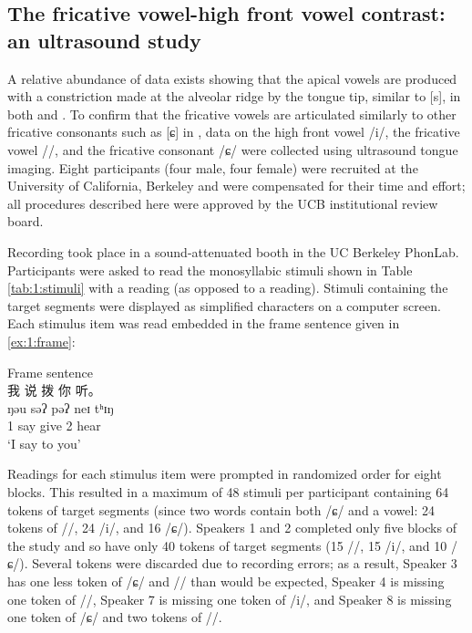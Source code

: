\documentclass[output=paper,hidelinks]{langscibook}
\begin{document}
\subsection{The fricative vowel-high front vowel contrast: an ultrasound study} \label{ultrasound}\label{sec:faytak:2.2}

A relative abundance of data exists showing that the apical vowels are produced with a constriction made at the alveolar ridge by the tongue tip, similar to [s], in both \MC{} and \SC{} \citep{zhou-wu, ling-phd, leekim-s, faytak-icphs}.
%
To confirm that the fricative vowels are articulated similarly to other fricative consonants such as [ɕ] in \SC{}, data on the \SC{} high front vowel /i/, the fricative vowel /\iz/, and the fricative consonant /ɕ/ were collected using ultrasound tongue imaging. Eight participants (four male, four female) were recruited at the University of California, Berkeley and were compensated for their time and effort; all procedures described here were approved by the UCB institutional review board.

Recording took place in a sound-attenuated booth in the UC Berkeley PhonLab. Participants were asked to read the monosyllabic stimuli shown in Table \ref{tab:1:stimuli} with a \SC{} reading (as opposed to a \MC{} reading). Stimuli containing the target segments were displayed as simplified  characters on a computer screen. Each stimulus item was read embedded in the frame sentence given in \ref{ex:1:frame}:

\ea\label{ex:1:frame}
\let\eachwordone\cjkfont
Frame sentence \SC{}\\
\glll 我 说 \underline{\hspace{0.5cm}} 拨 你 听。 \\
	ŋəu səʔ \underline{\hspace{0.5cm}} pəʔ neɪ  tʰɪŋ\\
	1{\sg} say \underline{\hspace{0.5cm}} give 2{\sg} hear\\
\glt `I say \underline{\hspace{0.5cm}} to you'
\z
{}

\noindent Readings for each stimulus item were prompted in randomized order for eight blocks. This resulted in a maximum of 48 stimuli per participant containing 64 tokens of target segments (since two words contain both /ɕ/ and a vowel: 24 tokens of /\iz{}/, 24 /i/, and 16 /ɕ/). Speakers 1 and 2 completed only five blocks of the study and so have only 40 tokens of target segments (15 /\iz{}/, 15 /i/, and 10 /ɕ/).
%
Several tokens were discarded due to recording errors; as a result, Speaker 3 has one less token of /ɕ/ and /\iz{}/ than would be expected, Speaker 4 is missing one token of /\iz{}/, Speaker 7 is missing one token of /i/, and Speaker 8 is missing one token of /ɕ/ and two tokens of /\iz{}/.
\end{document}
